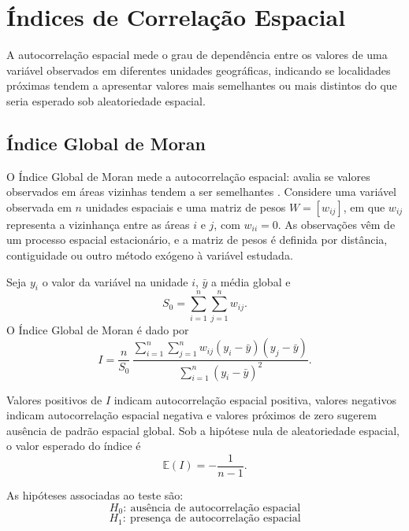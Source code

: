 \section{Índices de Correlação Espacial}

A autocorrelação espacial mede o grau de dependência entre os valores de uma variável observados em diferentes unidades geográficas, indicando se localidades próximas tendem a apresentar valores mais semelhantes ou mais distintos do que seria esperado sob aleatoriedade espacial.

\subsection{Índice Global de Moran}
\label{subsec:moran_global}

O Índice Global de Moran mede a autocorrelação espacial: avalia se valores observados em áreas vizinhas tendem a ser semelhantes \cite{moran1950}. Considere uma variável observada em \(n\) unidades espaciais e uma matriz de pesos \(W=[w_{ij}]\), em que \(w_{ij}\) representa a vizinhança entre as áreas \(i\) e \(j\), com \(w_{ii}=0\). As observações vêm de um processo espacial estacionário, e a matriz de pesos é definida por distância, contiguidade ou outro método exógeno à variável estudada.

Seja \(y_i\) o valor da variável na unidade \(i\), \(\bar{y}\) a média global e
\begin{equation}
S_0=\sum_{i=1}^{n}\sum_{j=1}^{n}w_{ij}.
\label{eq:s0_moran}
\end{equation}
O Índice Global de Moran é dado por
\begin{equation}
I=\frac{n}{S_0}\,
\frac{\sum_{i=1}^{n}\sum_{j=1}^{n} w_{ij}(y_i-\bar{y})(y_j-\bar{y})}
{\sum_{i=1}^{n}(y_i-\bar{y})^2}.
\label{eq:moran_global_refeito}
\end{equation}

Valores positivos de \(I\) indicam autocorrelação espacial positiva, valores negativos indicam autocorrelação espacial negativa e valores próximos de zero sugerem ausência de padrão espacial global. Sob a hipótese nula de aleatoriedade espacial, o valor esperado do índice é
\begin{equation}
\mathbb{E}(I)=-\frac{1}{n-1}.
\label{eq:moran_esperado}
\end{equation}

As hipóteses associadas ao teste são:
\begin{equation*}
H_0:\ \text{ausência de autocorrelação espacial}
\label{eq:moran_h0}
\end{equation*}
\begin{equation*}
H_1:\ \text{presença de autocorrelação espacial}
\label{eq:moran_h1}
\end{equation*}

